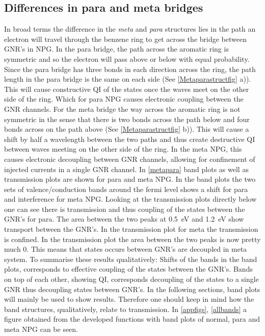 \subsection{Differences in para and meta bridges}\label{metaparasection}
In broad terms the difference in the \textit{meta} and \textit{para} structures lies in the path an electron will travel through the benzene ring to get across the bridge between GNR's in NPG. In the para bridge, the path across the aromatic ring is symmetric and so the electron will pass above or below with equal probability. Since the para bridge has three bonds in each direction across the ring, the path length in the para bridge is the same on each side (See \cref{Metaparastructfig} a)). This will cause constructive QI of the states once the waves meet on the other side of the ring. Which for para NPG causes electronic coupling between the GNR channels. For the meta bridge the way across the aromatic ring is not symmetric in the sense that there is two bonds across the path below and four bonds across on the path above (See \cref{Metaparastructfig} b)). This will cause a shift by half a wavelength between the two paths and thus create destructive QI between waves meeting on the other side of the ring. In the meta NPG, this causes electronic decoupling between GNR channels, allowing for confinement of injected currents in a single GNR channel\cite{unpub}. In \cref{metapara} band plots as well as transmission plots are shown for para and meta NPG. In the band plots the two sets of valence/conduction bands around the fermi level shows a shift for para and interference for meta NPG. Looking at the transmission plots directly below one can see there is transmission  and thus coupling of the states between the GNR's for para. The area between the two peaks at \SI{0.5}{\electronvolt} and  \SI{1.2}{\electronvolt} show transport between the GNR's. In the transmission plot for meta the transmission is confined. In the transmission plot the area between the two peaks is now pretty much 0. This means that  states occurs between GNR's are decoupled in meta system. To summarise these results qualitatively: Shifts of the bands in the band plots, corresponds to effective coupling of the states between the GNR's. Bands on top of each other, showing QI, corresponds decoupling of the states to a single GNR thus decoupling states between GNR's. In the following sections, band plots will mainly be used to show results. Therefore one should keep in mind how the band structures, qualitatively, relate to transmission. In \cref{appfigs}, \cref{allbands} a figure obtained from the developed functions with band plots of normal, para and meta NPG can be seen.
